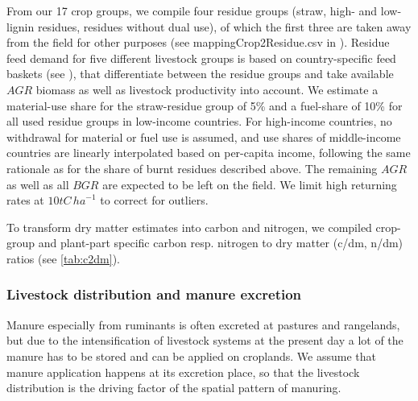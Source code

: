 \documentclass[gc, manuscript]{copernicus}
\begin{document}
From our 17 crop groups, we compile four residue groups (straw, high- and low-lignin residues, residues without dual use), of which the first three are taken away from the field for other purposes (see mappingCrop2Residue.csv in \citep{bodirsky_mrcommons_2020}). Residue feed demand for five different livestock groups is based on country-specific feed baskets (see \citep{weindl_livestock_2017}), that differentiate between the residue groups and take available \(AGR\) biomass as well as livestock productivity into account. We estimate a material-use share for the straw-residue group of 5\% and a fuel-share of 10\% for all used residue groups in low-income countries. For high-income countries, no withdrawal for material or fuel use is assumed, and use shares of middle-income countries are linearly interpolated based on per-capita income, following the same rationale as for the share of burnt residues described above. The remaining \(AGR\) as well as all \(BGR\) are expected to be left on the field. We limit high returning rates at \(10\unit{tC\,ha}^{-1}\) to correct for outliers.

To transform dry matter estimates into carbon and nitrogen, we compiled crop-group and plant-part specific carbon resp. nitrogen to dry matter (c/dm, n/dm) ratios (see \ref{tab:c2dm}).

\hypertarget{sec:livstmanure}{%
\subsubsection{Livestock distribution and manure excretion}\label{sec:livstmanure}}

Manure especially from ruminants is often excreted at pastures and rangelands, but due to the intensification of livestock systems at the present day a lot of the manure has to be stored and can be applied on croplands. We assume that manure application happens at its excretion place, so that the livestock distribution is the driving factor of the spatial pattern of manuring.
\end{document}

